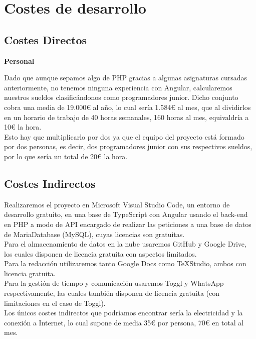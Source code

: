 \clearpage

\section{Costes de desarrollo}
	
\subsection{Costes Directos}	

\textbf{Personal}

Dado que aunque sepamos algo de PHP gracias a algunas asignaturas cursadas anteriormente, no tenemos ninguna experiencia con Angular, calcularemos nuestros sueldos clasificándonos como programadores junior. Dicho conjunto cobra una media de 19.000€ al año, lo cual sería 1.584€ al mes, que al dividirlos en un horario de trabajo de 40 horas semanales, 160 horas al mes, equivaldría a 10€ la hora.\\

Esto hay que multiplicarlo por dos ya que el equipo del proyecto está formado por dos personas, es decir, dos programadores junior con sus respectivos sueldos, por lo que sería un total de 20€ la hora.\\

\subsection{Costes Indirectos}

Realizaremos el proyecto en Microsoft Visual Studio Code, un entorno de desarrollo gratuito, en una base de TypeScript con Angular usando el back-end en PHP a modo de API encargado de realizar las peticiones a una base de datos de MariaDatabase (MySQL), cuyas licencias son gratuitas.\\

Para el almacenamiento de datos en la nube usaremos GitHub y Google Drive, los cuales disponen de licencia gratuita con aspectos limitados.\\

Para la redacción utilizaremos tanto Google Docs como TeXStudio, ambos con licencia gratuita.\\

Para la gestión de tiempo y comunicación usaremos Toggl y WhatsApp respectivamente, las cuales también disponen de licencia gratuita (con limitaciones en el caso de Toggl).\\

Los únicos costes indirectos que podríamos encontrar sería la electricidad y la conexión a Internet, lo cual supone de media 35€ por persona, 70€ en total al mes.\\

